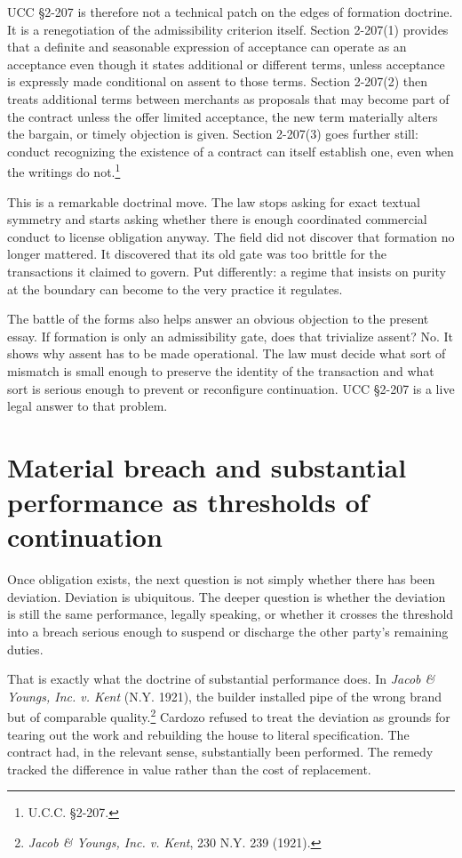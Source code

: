 \documentclass[11pt]{article}
\begin{document}
UCC \S 2-207 is therefore not a technical patch on the edges of formation doctrine. It is a renegotiation of the admissibility criterion itself. Section 2-207(1) provides that a definite and seasonable expression of acceptance can operate as an acceptance even though it states additional or different terms, unless acceptance is expressly made conditional on assent to those terms. Section 2-207(2) then treats additional terms between merchants as proposals that may become part of the contract unless the offer limited acceptance, the new term materially alters the bargain, or timely objection is given. Section 2-207(3) goes further still: conduct recognizing the existence of a contract can itself establish one, even when the writings do not.\footnote{U.C.C. \S 2-207.}

This is a remarkable doctrinal move. The law stops asking for exact textual symmetry and starts asking whether there is enough coordinated commercial conduct to license obligation anyway. The field did not discover that formation no longer mattered. It discovered that its old gate was too brittle for the transactions it claimed to govern. Put differently: a regime that insists on purity at the boundary can become \inadmissible{} to the very practice it regulates.

The battle of the forms also helps answer an obvious objection to the present essay. If formation is only an admissibility gate, does that trivialize assent? No. It shows why assent has to be made operational. The law must decide what sort of mismatch is small enough to preserve the identity of the transaction and what sort is serious enough to prevent or reconfigure continuation. UCC \S 2-207 is a live legal answer to that problem.

\section{Material breach and substantial performance as thresholds of continuation}
Once obligation exists, the next question is not simply whether there has been deviation. Deviation is ubiquitous. The deeper question is whether the deviation is still the same performance, legally speaking, or whether it crosses the threshold into a breach serious enough to suspend or discharge the other party's remaining duties.

That is exactly what the doctrine of substantial performance does. In \textit{Jacob \& Youngs, Inc. v. Kent} (N.Y. 1921), the builder installed pipe of the wrong brand but of comparable quality.\footnote{\textit{Jacob \& Youngs, Inc. v. Kent}, 230 N.Y. 239 (1921).} Cardozo refused to treat the deviation as grounds for tearing out the work and rebuilding the house to literal specification. The contract had, in the relevant sense, substantially been performed. The remedy tracked the difference in value rather than the cost of replacement.
\end{document}

